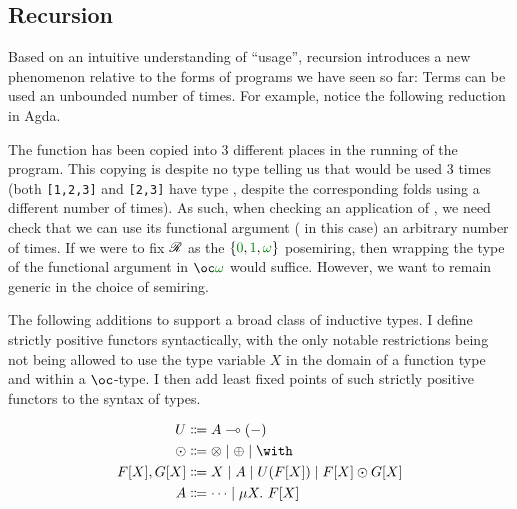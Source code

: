 \begin{mathpar}
\end{mathpar}

\subsection{Recursion}\label{sec:rec}

Based on an intuitive understanding of ``usage'', recursion introduces a new
phenomenon relative to the forms of programs we have seen so far:
Terms can be used an unbounded number of times.
For example, notice the following reduction in Agda.


The function \AgdaFunction{\_+\_} has been copied into 3 different places in
the running of the program.
This copying is despite no type telling us that \AgdaFunction{\_+\_} would be
used 3 times (both \verb|[1,2,3]| and \verb|[2,3]| have type
\AgdaSpace{}, despite the
corresponding folds using \AgdaFunction{\_+\_} a different number of times).
As such, when checking an application of , we need check
that we can use its functional argument (\AgdaFunction{\_+\_} in this case) an
arbitrary number of times.
If we were to fix $\Ann$ as the $\{\gr0, \gr1, \gr\omega\}$ posemiring, then
wrapping the type of the functional argument in $\oc\gr\omega$ would suffice.
However, we want to remain generic in the choice of semiring.

The following additions to \name{} support a broad class of
inductive types.
I define strictly positive functors syntactically, with the only notable
restrictions being not being allowed to use the type variable $X$ in the domain
of a function type and within a $\oc$-type.
I then add least fixed points of such strictly positive functors to the syntax
of types.

\begin{align*}
  U &\Coloneqq A \multimap (-) \\
  {\odot} &\Coloneqq {\otimes} \mid {\oplus} \mid {\with} \\
  F[X], G[X] &\Coloneqq X \mid A \mid U(F[X]) \mid F[X] \odot G[X] \\
  A &\Coloneqq \cdots \mid \mu X.~F[X]
\end{align*}

